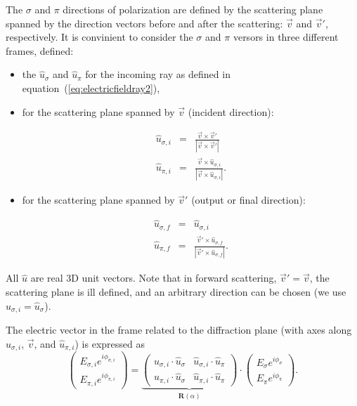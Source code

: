 \documentclass{iucr}
\begin{document}
The $\sigma$ and $\pi$ directions of polarization are defined by the scattering plane spanned by the direction vectors before and after the scattering: $\vec{v}$ and $\vec{v}'$, respectively.
It is convinient to consider the $\sigma$ and $\pi$ versors in three different frames, defined:
\begin{itemize}
    \item the $\hat{u}_\sigma$ and $\hat{u}_\pi$ for the incoming ray as defined in equation~(\ref{eq:electricfieldray2}), 

    \item for the scattering plane spanned by $\vec{v}$ (incident direction): 

\begin{eqnarray}\label{eq:u_i}
  \hat{u}_{\sigma,i} 
  &=&
  \frac{\vec{v} \times \vec{v}'}{\left| \vec{v} \times \vec{v}' \right|}
  \nonumber \\
  \hat{u}_{\pi,i}
  &=&
  \frac{\vec{v} \times \hat{u}_{\sigma,i}}{\left| \vec{v} \times \hat{u}_{\sigma,i} \right|}.
\end{eqnarray}

    \item for the scattering plane spanned by $\vec{v}'$ (output or final direction): 

\begin{eqnarray}\label{eq:u_f}
  \hat{u}_{\sigma,f} 
  &=&
  \hat{u}_{\sigma,i} 
  \nonumber \\
  \hat{u}_{\pi,f}
  &=&
  \frac{\vec{v}' \times \hat{u}_{\sigma,f}}{\left| \vec{v}' \times \hat{u}_{\sigma,f} \right|}.
\end{eqnarray}
\end{itemize}
All $\hat{u}$ are real 3D unit vectors.
Note that in forward scattering, $\vec{v}' = \vec{v}$, the scattering plane is ill defined, and an arbitrary direction can be chosen (we use $\hat{u}_{\sigma,i}=\hat{u}_{\sigma}$).

The electric vector in the frame related to the diffraction plane (with axes along $\hat{u}_{\sigma,i}$, $\vec{v}$, and $\hat{u}_{\pi,i}$) is expressed as 
\begin{equation}
  \left( \begin{array}{c}
    E_{\sigma,i} e^{i \phi_{\sigma,i}} \\
    E_{\pi,i} e^{i \phi_{\pi,i}}
  \end{array} \right)
  =
  \underbrace{
  \left( \begin{array}{cc}
    \hat{u}_{\sigma,i} \cdot \hat{u}_{\sigma} &
    \hat{u}_{\sigma,i} \cdot \hat{u}_{\pi} \\
    \hat{u}_{\pi,i} \cdot \hat{u}_{\sigma} &
    \hat{u}_{\pi,i} \cdot \hat{u}_{\pi} 
  \end{array} \right)
  }_{\textbf{R}(\alpha)}
  \cdot
  \left( \begin{array}{c}
    E_{\sigma} e^{i \phi_{\sigma}} \\
    E_{\pi} e^{i \phi_{\pi}}
  \end{array} \right).
\end{equation}
\end{document}
